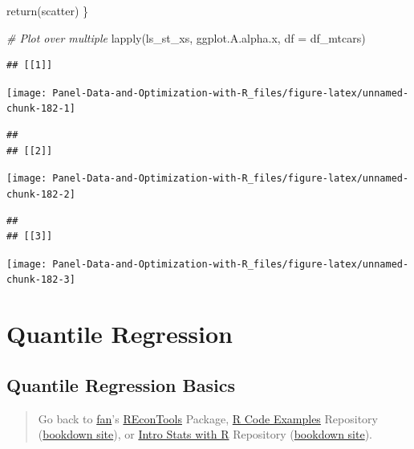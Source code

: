 \documentclass[
]{book}
\newenvironment{Shaded}{\begin{snugshade}}{\end{snugshade}}
\newcommand{\AttributeTok}[1]{\textcolor[rgb]{0.77,0.63,0.00}{#1}}
\newcommand{\CommentTok}[1]{\textcolor[rgb]{0.56,0.35,0.01}{\textit{#1}}}
\newcommand{\FunctionTok}[1]{\textcolor[rgb]{0.00,0.00,0.00}{#1}}
\newcommand{\NormalTok}[1]{#1}
\begin{document}
\begin{Shaded}
\begin{Highlighting}[]
\FunctionTok{return}\NormalTok{(scatter)}
\NormalTok{\}}

\CommentTok{\# Plot over multiple}
\FunctionTok{lapply}\NormalTok{(ls\_st\_xs,}
\NormalTok{       ggplot.A.alpha.x,}
       \AttributeTok{df =}\NormalTok{ df\_mtcars)}
\end{Highlighting}
\end{Shaded}

\begin{verbatim}
## [[1]]
\end{verbatim}

\begin{center}\texttt{[image: Panel-Data-and-Optimization-with-R\_files/figure-latex/unnamed-chunk-182-1]} \end{center}

\begin{verbatim}
## 
## [[2]]
\end{verbatim}

\begin{center}\texttt{[image: Panel-Data-and-Optimization-with-R\_files/figure-latex/unnamed-chunk-182-2]} \end{center}

\begin{verbatim}
## 
## [[3]]
\end{verbatim}

\begin{center}\texttt{[image: Panel-Data-and-Optimization-with-R\_files/figure-latex/unnamed-chunk-182-3]} \end{center}

\hypertarget{quantile-regression}{%
\section{Quantile Regression}\label{quantile-regression}}

\hypertarget{quantile-regression-basics}{%
\subsection{Quantile Regression Basics}\label{quantile-regression-basics}}

\begin{quote}
Go back to \href{http://fanwangecon.github.io/}{fan}'s \href{https://fanwangecon.github.io/REconTools/}{REconTools} Package, \href{https://fanwangecon.github.io/R4Econ/}{R Code Examples} Repository (\href{https://fanwangecon.github.io/R4Econ/bookdown}{bookdown site}), or \href{https://fanwangecon.github.io/Stat4Econ/}{Intro Stats with R} Repository (\href{https://fanwangecon.github.io/Stat4Econ/bookdown}{bookdown site}).
\end{quote}
\end{document}

